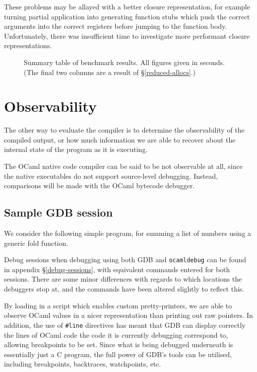 These problems may be allayed with a better closure representation, for example 
turning partial application into generating function stubs which push the 
correct arguments into the correct registers before jumping to the function 
body. Unfortunately, there was insufficient time to investigate more performant 
closure representations.

\begin{figure}
    \centering
    \resizebox{\textwidth}{!}{
        
    }
    \caption{Summary table of benchmark results. All figures given in 
    seconds. (The final two columns are a result of \S\ref{reduced-allocs}.)}
\end{figure}

\section{Observability}\label{observability}

The other way to evaluate the compiler is to determine the observability of 
the compiled output, or how much information we are able to recover about the 
internal state of the program as it is executing.

The OCaml native code compiler can be said to be not observable at all, since
the native executables do not support source-level debugging. Instead,
comparisons will be made with the OCaml bytecode debugger.

\subsection{Sample GDB session}

We consider the following simple program, for summing a list of numbers using a 
generic fold function.



Debug sessions when debugging using both GDB and \texttt{ocamldebug} can be
found in appendix \S\ref{debug-sessions}, with equivalent commands entered
for both sessions. There are some minor differences with regards to which
locations the debuggers stop at, and the commands have been altered slightly to
reflect this.

By loading in a script which enables custom pretty-printers, we are able to
observe OCaml values in a nicer representation than printing out raw pointers.
In addition, the use of \texttt{\#}\texttt{line} directives has meant that GDB
can display correctly the lines of OCaml code the code it is currently debugging
correspond to, allowing breakpoints to be set. Since what is being debugged
underneath is essentially just a C program, the full power of GDB's tools can be
utilised, including breakpoints, backtraces, watchpoints, etc.

